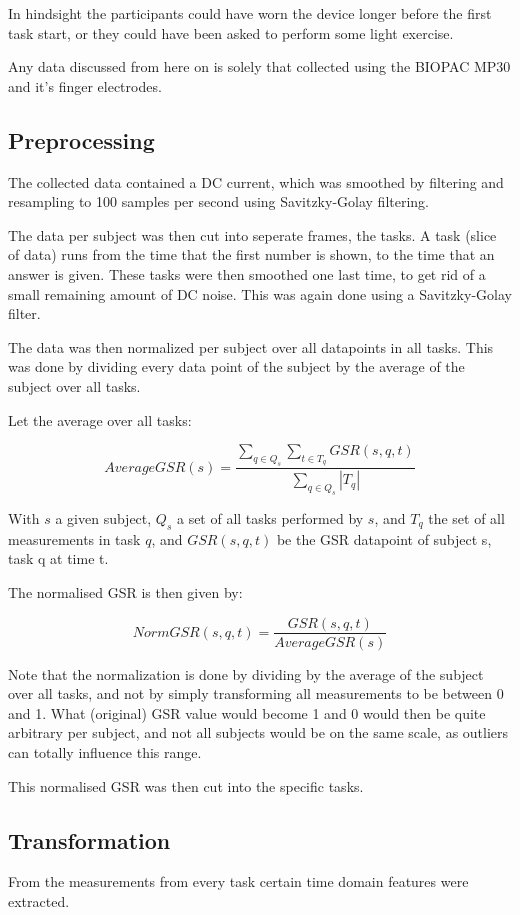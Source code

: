 \documentclass[11pt,leqno,letterpaper]{report} %
\begin{document}
In hindsight the participants could have worn the device longer before the first task start, or they could have been asked to perform some light exercise. 

Any data discussed from here on is solely that collected using the BIOPAC MP30 and it's finger electrodes.


\subsection{Preprocessing}
The collected data contained a DC current, which was smoothed by filtering and resampling to 100 samples per second using Savitzky-Golay filtering. 

The data per subject was then cut into seperate frames, the tasks. A task (slice of data) runs from the time that the first number is shown, to the time that an answer is given. These tasks were then smoothed one last time, to get rid of a small remaining amount of DC noise. This was again done using a Savitzky-Golay filter.

The data was then normalized per subject over all datapoints in all tasks. This was done by dividing every data point of the subject by the average of the subject over all tasks. 

Let the average over all tasks:


\[
AverageGSR(s) = \frac 
{\sum_{q \in Q_s}\sum_{t \in T_q} GSR(s,q,t)}
{ \sum_{q \in Q_s} \left\vert{T_q}\right\vert }
\]

With $s$ a given subject, $Q_s$ a set of all tasks performed by $s$, and $T_q$ the set of all measurements in task $q$, and $GSR(s,q,t)$ be the GSR datapoint of subject s, task q at time t.

The normalised GSR is then given by:

\[
NormGSR(s,q,t) = \frac{GSR(s,q,t)}{AverageGSR(s)}
\]

Note that the normalization is done by dividing by the average of the subject over all tasks, and not by simply transforming all measurements to be between 0 and 1. What (original) GSR value would become 1 and 0 would then be quite arbitrary per subject, and not all subjects would be on the same scale, as outliers can totally influence this range.

This normalised GSR was then cut into the specific tasks.

\subsection{Transformation}
From the measurements from every task certain time domain features were extracted. 
\end{document}
